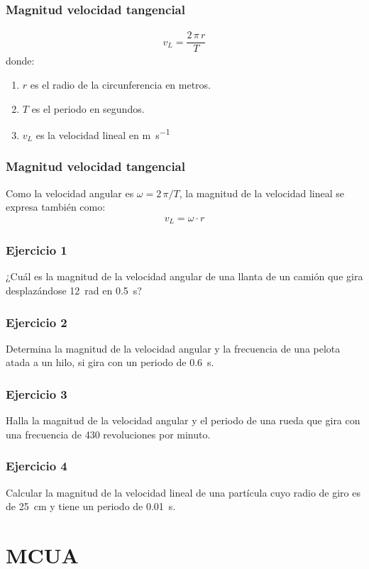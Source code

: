 \documentclass[14pt]{beamer}
\begin{document}
\begin{frame}
\frametitle{Magnitud velocidad tangencial}
\begin{align*}
v_{L} = \dfrac{2 \, \pi \, r}{T}
\end{align*}
donde:
\pause
{}
\begin{enumerate}[<+->]
\item $r$ es el radio de la circunferencia en metros.
\item $T$ es el periodo en segundos.
\item $v_{L}$ es la velocidad lineal en \unit{\meter\per\second}
\end{enumerate}
\end{frame}
\begin{frame}
\frametitle{Magnitud velocidad tangencial}

Como la velocidad angular es $\omega = 2 \, \pi /T$, la magnitud de la velocidad lineal se expresa también como:
\pause
\begin{align*}
v_{L} = \omega \cdot r
\end{align*}
\end{frame}
\begin{frame}
\frametitle{Ejercicio 1}
¿Cuál es la magnitud de la velocidad angular de una llanta de un camión que gira desplazándose \SI{12}{\radian} en \SI{0.5}{\second}?
\end{frame}
\begin{frame}
\frametitle{Ejercicio 2}
Determina la magnitud de la velocidad angular y la
frecuencia de una pelota atada a un hilo, si gira con un periodo de \SI{0.6}{\second}.
\end{frame}
\begin{frame}
\frametitle{Ejercicio 3}
Halla la magnitud de la velocidad angular y el periodo de una rueda que gira con una frecuencia de \num{430} revoluciones por minuto.
\end{frame}
\begin{frame}
\frametitle{Ejercicio 4}
Calcular la magnitud de la velocidad lineal de una partícula cuyo radio de giro es de \SI{25}{\centi\meter} y tiene un periodo de \SI{0.01}{\second}.
\end{frame}

\section{MCUA}
\end{document}
